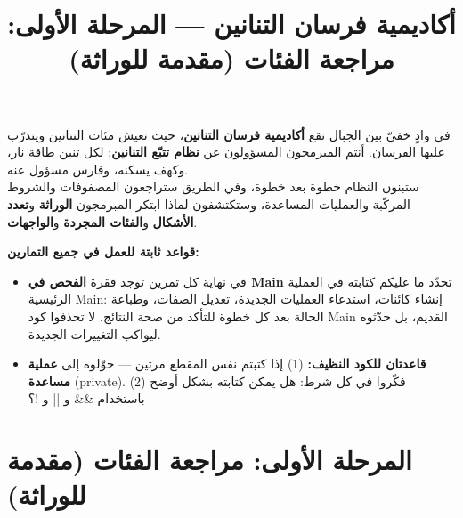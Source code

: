 \documentclass[14pt]{extarticle}
\title{أكاديمية فرسان التنانين — المرحلة الأولى: مراجعة الفئات (مقدمة للوراثة)}
\begin{document}
\maketitle
\thispagestyle{fancy}

\begin{boxDef}
في وادٍ خفيّ بين الجبال تقع \textbf{أكاديمية فرسان التنانين}، حيث تعيش مئات التنانين ويتدرّب عليها الفرسان. أنتم المبرمجون المسؤولون عن \textbf{نظام تتبّع التنانين}: لكل تنين طاقة نار، وكهف يسكنه، وفارس مسؤول عنه. \\
ستبنون النظام خطوة بعد خطوة، وفي الطريق ستراجعون المصفوفات والشروط المركّبة والعمليات المساعدة، وستكتشفون لماذا ابتكر المبرمجون \textbf{الوراثة} و\textbf{تعدد الأشكال} و\textbf{الفئات المجردة} و\textbf{الواجهات}.
\end{boxDef}

\begin{boxWarning}
\textbf{قواعد ثابتة للعمل في جميع التمارين:}
\begin{itemize}
    \item في نهاية كل تمرين توجد فقرة \textbf{الفحص في \textenglish{Main}} تحدّد ما عليكم كتابته في العملية الرئيسية \textenglish{Main}: إنشاء كائنات، استدعاء العمليات الجديدة، تعديل الصفات، وطباعة الحالة بعد كل خطوة للتأكد من صحة النتائج. لا تحذفوا كود \textenglish{Main} القديم، بل حدّثوه ليواكب التغييرات الجديدة.
    \item \textbf{قاعدتان للكود النظيف:} (1) إذا كتبتم نفس المقطع مرتين — حوّلوه إلى \textbf{عملية مساعدة} (\textenglish{private}). (2) فكّروا في كل شرط: هل يمكن كتابته بشكل أوضح باستخدام \textenglish{\&\&} و \textenglish{||} و \textenglish{!}؟
\end{itemize}
\end{boxWarning}

\section*{المرحلة الأولى: مراجعة الفئات (مقدمة للوراثة)}
\end{document}
